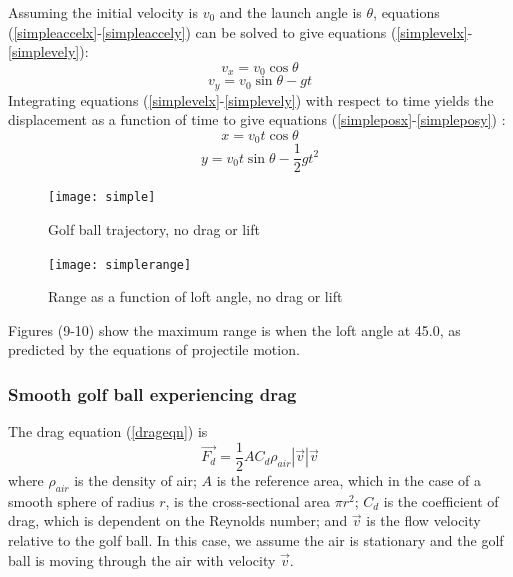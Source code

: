 \documentclass[12pt]{article}
\begin{document}
Assuming the initial velocity is $v_0$ and the launch angle is $\theta$, equations (\ref{simpleaccelx}-\ref{simpleaccely}) can be solved to give equations (\ref{simplevelx}-\ref{simplevely}):
\begin{equation} \label{simplevelx}
v_x=v_0 \cos{\theta}
\end{equation}
\begin{equation} \label{simplevely}
v_y=v_0 \sin{\theta}-gt
\end{equation}
Integrating equations (\ref{simplevelx}-\ref{simplevely}) with respect to time yields the displacement as a function of time to give equations (\ref{simpleposx}-\ref{simpleposy}) \cite{Penner2001}:
\begin{equation} \label{simpleposx}
x=v_0 t \cos{\theta}
\end{equation}
\begin{equation} \label{simpleposy}
y=v_0 t \sin{\theta}-\frac{1}{2} g t^2
\end{equation}

\begin{figure}[H]
\centering
\caption{Golf ball trajectory, no drag or lift}
\texttt{[image: simple]}
\end{figure}

\begin{figure}[H]
\centering
\caption{Range as a function of loft angle, no drag or lift}
\texttt{[image: simplerange]}
\end{figure}

Figures (9-10) show the maximum range is when the loft angle at 45.0\degree, as predicted by the equations of projectile motion.
\subsubsection{Smooth golf ball experiencing drag}
The drag equation (\ref{drageqn}) is
\begin{equation} \label{drageqn}
\vec{F_{d}} = \frac{1}{2} A C_{d} \rho_{air} |\vec{v}| \vec{v}
\end{equation}
where $\rho_{air}$ is the density of air; $A$ is the reference area, which in the case of a smooth sphere of radius $r$, is the cross-sectional area $\pi r^2$; $C_d$ is the coefficient of drag, which is dependent on the Reynolds number; and $\vec{v}$ is the flow velocity relative to the golf ball. In this case, we assume the air is stationary and the golf ball is moving through the air with velocity $\vec{v}$.
\end{document}
